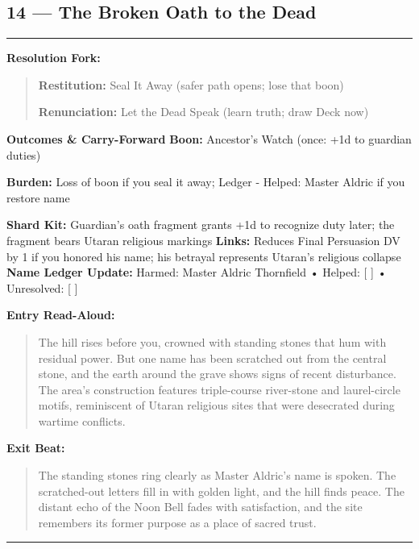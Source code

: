 \documentclass[18pt, letterpaper, twoside]{article}
\newenvironment{floorbox}[1]{%
    \begin{center}
    \begin{minipage}{0.95\textwidth}
    \subsection*{#1}
    \vspace{-0.5em}
    \rule{\textwidth}{0.5pt}
    \vspace{0.5em}
}{%
    \vspace{0.5em}
    \rule{\textwidth}{0.5pt}
    \end{minipage}
    \end{center}
}
\newenvironment{resolutionbox}{%
    \vspace{0.5em}
    \noindent\textbf{Resolution Fork:}
    \begin{quote}
}{%
    \end{quote}
    \vspace{0.5em}
}
\newenvironment{boxedtext}[1]{%
    \vspace{0.5em}
    \noindent\textbf{#1}
    \begin{quote}
}{%
    \end{quote}
    \vspace{0.5em}
}
\newcommand{\boon}[1]{\noindent\textbf{Boon:} #1\par}
\newcommand{\burden}[1]{\noindent\textbf{Burden:} #1\par}
\newcommand{\entrytext}[1]{\begin{boxedtext}{Entry Read-Aloud:} #1 \end{boxedtext}}
\newcommand{\exittext}[1]{\begin{boxedtext}{Exit Beat:} #1 \end{boxedtext}}
\begin{document}
\begin{floorbox}{14 --- The Broken Oath to the Dead}
\begin{resolutionbox}
\textbf{Restitution:} Seal It Away (safer path opens; lose that boon)

\textbf{Renunciation:} Let the Dead Speak (learn truth; draw Deck now)
\end{resolutionbox}

\textbf{Outcomes \& Carry-Forward}
\boon{Ancestor's Watch (once: +1d to guardian duties)}
\burden{Loss of boon if you seal it away; Ledger - Helped: Master Aldric if you restore name}
\textbf{Shard Kit:} Guardian's oath fragment grants +1d to recognize duty later; the fragment bears Utaran religious markings
\textbf{Links:} Reduces Final Persuasion DV by 1 if you honored his name; his betrayal represents Utaran's religious collapse
\textbf{Name Ledger Update:} Harmed: Master Aldric Thornfield • Helped: [ ] • Unresolved: [ ]

\entrytext{The hill rises before you, crowned with standing stones that hum with residual power. But one name has been scratched out from the central stone, and the earth around the grave shows signs of recent disturbance. The area's construction features triple-course river-stone and laurel-circle motifs, reminiscent of Utaran religious sites that were desecrated during wartime conflicts.}

\exittext{The standing stones ring clearly as Master Aldric's name is spoken. The scratched-out letters fill in with golden light, and the hill finds peace. The distant echo of the Noon Bell fades with satisfaction, and the site remembers its former purpose as a place of sacred trust.}
\end{floorbox}
\end{document}
